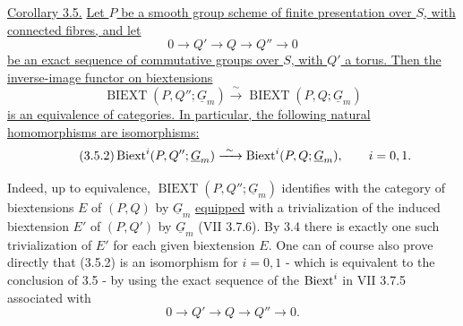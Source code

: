 
\medskip
\noindent\underline{Corollary 3.5.}  \underline{Let $P$ be a smooth
group scheme of finite presentation over $S$, with connected fibres,
and let}
\[
 0\longrightarrow Q'\longrightarrow Q\longrightarrow Q''
 \longrightarrow0
\]
\underline{be an exact sequence of commutative groups over $S$, with
$Q'$ a torus.  Then the inverse-image functor on biextensions}
\begin{equation}\tag{3.5.1}
 \operatorname{BIEXT}(P,Q'';\underline G_m)
 \xrightarrow{\ \sim\ }
 \operatorname{BIEXT}(P,Q;\underline G_m)
\end{equation}
\underline{is an equivalence of categories.  In particular, the
following natural homomorphisms are isomorphisms:}
\begin{equation}\tag{3.5.2}
 \Biext^i(P,Q'';\underline G_m)
 \xrightarrow{\ \sim\ }
 \Biext^i(P,Q;\underline G_m),
 \qquad i=0,1.
\end{equation}

Indeed, up to equivalence, $\operatorname{BIEXT}(P,Q'';\underline
G_m)$ identifies with the category of biextensions $E$ of $(P,Q)$ by
$\underline G_m$ \underline{equipped} with a trivialization of the
induced biextension $E'$ of $(P,Q')$ by $\underline G_m$ (VII
3.7.6).  By 3.4 there is exactly one such trivialization of $E'$ for
each given biextension $E$.  One can of course also prove directly
that (3.5.2) is an isomorphism for $i=0,1$ - which is equivalent to
the conclusion of 3.5 - by using the exact sequence of the
$\operatorname{Biext}^i$ in VII 3.7.5 associated with
\[
 0\longrightarrow Q'\longrightarrow Q\longrightarrow Q''
 \longrightarrow0.
\]

